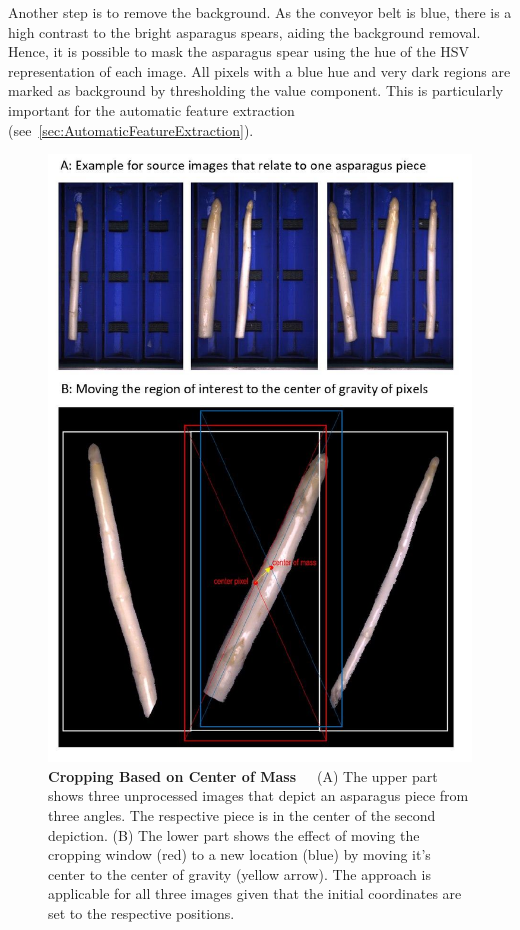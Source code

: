 Another step is to remove the background. As the conveyor belt is blue, there is a high contrast to the bright asparagus spears, aiding the background removal. Hence, it is possible to mask the asparagus spear using the hue of the HSV representation of each image. All pixels with a blue hue and very dark regions are marked as background by thresholding the value component. This is particularly important for the automatic feature extraction (see~\autoref{sec:AutomaticFeatureExtraction}).

\begin{figure}[!ht]
	\centering
	\includegraphics[scale=0.4]{Figures/chapter03/preprocessing_cropping.png}
	\decoRule
	\caption[Cropping Based on Center of Mass]{\textbf{Cropping Based on Center of Mass}~~~(A) The upper part shows three unprocessed images that depict an asparagus piece from three angles. The respective piece is in the center of the second depiction. (B) The lower part shows the effect of moving the cropping window (red) to a new location (blue) by moving it's center to the center of gravity (yellow arrow). The approach is applicable for all three images given that the initial coordinates are set to the respective positions.}
	\label{fig:PreprocessingCropping}
\end{figure}


